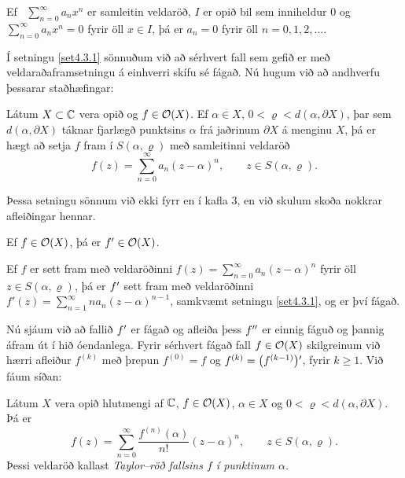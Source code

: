 \begin{fs}  Ef \ $\sum_{n=0}^{\infty} a_nx^n$ er samleitin veldaröð,
$I$ er opið bil sem inniheldur $0$ og   $\sum_{n=0}^{\infty}
a_nx^n=0$  fyrir öll $x\in I$, þá er $a_n=0$ fyrir öll $n=0,1,2,\dots$.
\end{fs}


Í setningu \ref{set4.3.1}
sönnuðum við að sérhvert fall sem gefið er með veldaraðaframsetningu á
einhverri skífu sé fágað.  Nú hugum við að andhverfu þessarar
staðhæfingar:

\begin{se}
Látum $X\subset {\mathbb C}$ vera opið og $f\in {\cal O}(X)$.  Ef $\alpha\in X$,
$0<\varrho<d(\alpha,\partial X)$, þar sem  $d(\alpha,\partial X)$
táknar fjarlægð punktsins $\alpha$ frá jaðrinum $\partial X$ á
menginu $X$, þá er hægt að setja $f$ fram í $S(\alpha,\varrho)$ með
samleitinni veldaröð  
 $$f(z) = \sum\limits_{n=0}^\infty a_n(z-\alpha)^n, \qquad z\in
S(\alpha,\varrho). 
 $$
 \end{se}



Þessa setningu sönnum við ekki fyrr en í kafla 3, en við skulum skoða
nokkrar afleiðingar hennar.  

\begin{fs}
Ef $f\in {\cal O}(X)$, þá er $f{\sp{\prime}}\in {\cal O}(X)$.
\end{fs}

\begin{so}
Ef $f$ er sett fram með veldaröðinni 
$f(z)=\sum_{n=0}^\infty a_n(z-\alpha)^n$ fyrir öll $z\in
S(\alpha,\varrho)$,
þá er $f{\sp{\prime}}$ sett fram með veldaröðinni
$f'(z)=\sum_{n=1}^\infty na_n(z-\alpha)^{n-1}$,
samkvæmt setningu \ref{set4.3.1}, og er því fágað.
\end{so}

\bigskip
Nú sjáum við að fallið $f{\sp{\prime}}$ er fágað og afleiða þess $f{\sp{\prime\prime}}$ er
einnig fáguð og þannig áfram út í hið óendanlega.  Fyrir sérhvert
fágað fall $f\in {\cal O}(X)$ skilgreinum við hærri afleiður $f^{(k)}$ með
þrepun $f^{(0)}=f$ og $f^{(k)}=\big(f^{(k-1)}\big){\sp{\prime}}$, fyrir
$k\geq 1$. Við fáum síðan:

\begin{se}\label{se:2.3.7}  
Látum $X$ vera opið hlutmengi af ${\mathbb C}$, $f\in {\cal O}(X)$, $\alpha\in
X$ og $0<\varrho<d(\alpha,\partial X)$.  Þá er 
 $$f(z)= \sum\limits_{n=0}^\infty \dfrac
{f^{(n)}(\alpha)}{n!}(z-\alpha)^n, \qquad z\in S(\alpha,\varrho).
 $$
Þessi veldaröð kallast {\it
Taylor--röð
fallsins $f$ í punktinum $\alpha$}.
\end{se}

